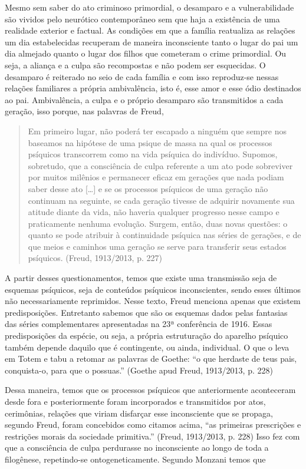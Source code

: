 Mesmo sem saber do ato criminoso primordial, o desamparo e a
vulnerabilidade são vividos pelo neurótico contemporâneo sem que haja a
existência de uma realidade exterior e factual. As condições em que a
família reatualiza as relações um dia estabelecidas recuperam de maneira
inconsciente tanto o lugar do pai um dia almejado quanto o lugar dos
filhos que cometeram o crime primordial. Ou seja, a aliança e a culpa
são recompostas e não podem ser esquecidas. O desamparo é reiterado no
seio de cada família e com isso reproduz-se nessas relações familiares a
própria ambivalência, isto é, esse amor e esse ódio destinados ao pai.
Ambivalência, a culpa e o próprio desamparo são transmitidos a cada
geração, isso porque, nas palavras de Freud,

\begin{quote}
Em primeiro lugar, não poderá ter escapado a ninguém que sempre nos
baseamos na hipótese de uma psique de massa na qual os processos
psíquicos transcorrem como na vida psíquica do indivíduo. Supomos,
sobretudo, que a consciência de culpa referente a um ato pode sobreviver
por muitos milênios e permanecer eficaz em gerações que nada podiam
saber desse ato {[}\ldots{}{]} e se os processos psíquicos de uma geração não
continuam na seguinte, se cada geração tivesse de adquirir novamente sua
atitude diante da vida, não haveria qualquer progresso nesse campo e
praticamente nenhuma evolução. Surgem, então, duas novas questões: o
quanto se pode atribuir à continuidade psíquica nas séries de gerações,
e de que meios e caminhos uma geração se serve para transferir seus
estados psíquicos. (Freud, 1913/2013, p. 227)
\end{quote}

A partir desses questionamentos, temos que existe uma transmissão seja
de esquemas psíquicos, seja de conteúdos psíquicos inconscientes, sendo
esses últimos não necessariamente reprimidos. Nesse texto, Freud
menciona apenas que existem predisposições. Entretanto sabemos que são
os esquemas dados pelas fantasias das séries complementares apresentadas
na 23ª conferência de 1916. Essas predisposições da espécie, ou seja, a
própria estruturação do aparelho psíquico também depende daquilo que é
contingente, ou ainda, individual. O que o leva em Totem e tabu a
retomar as palavras de Goethe: ``o que herdaste de teus pais,
conquista-o, para que o possuas.'' (Goethe apud Freud, 1913/2013, p.
228)

Dessa maneira, temos que os processos psíquicos que anteriormente
aconteceram desde fora e posteriormente foram incorporados e
transmitidos por atos, cerimônias, relações que viriam disfarçar esse
inconsciente que se propaga, segundo Freud, foram concebidos como
citamos acima, ``as primeiras prescrições e restrições morais da
sociedade primitiva.'' (Freud, 1913/2013, p. 228) Isso fez com que a
consciência de culpa perdurasse no inconsciente ao longo de toda a
filogênese, repetindo-se ontogeneticamente. Segundo Monzani temos que

